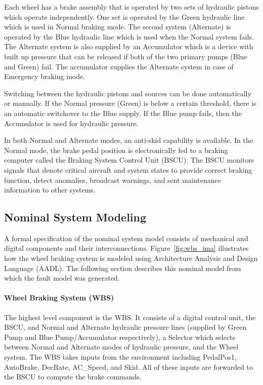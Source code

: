 Each wheel has a brake assembly that is operated by two sets of hydraulic pistons which operate independently. One set is operated by the Green hydraulic line which is used in Normal braking mode. The second system (Alternate) is operated by the Blue hydraulic line which is used when the Normal system fails. The Alternate system is also supplied by an Accumulator which is a device with built up pressure that can be released if both of the two primary pumps (Blue and Green) fail. The accumulator supplies the Alternate system in case of Emergency braking mode.

Switching between the hydraulic pistons and sources can be done automatically or manually. If the Normal pressure (Green) is below a certain threshold, there is an automatic switchover to the Blue supply. If the Blue pump fails, then the Accumulator is used for hydraulic pressure.

In both Normal and Alternate modes, an anti-skid capability is available. In the Normal mode, the brake pedal position is electronically fed to a braking computer called the Braking System Control Unit (BSCU). The BSCU monitors signals that denote critical aircraft and system states to provide correct braking function, detect anomalies, broadcast warnings, and sent maintenance information to other systems.

\subsection{Nominal System Modeling}
A formal specification of the nominal system model consists of mechanical and digital components and their interconnections. Figure~\ref{fig:wbs_ima} illustrates how the wheel braking system is modeled using Architecture Analysis and Design Language (AADL). The following section describes this nominal model from which the fault model was generated.

\paragraph{Wheel Braking System (WBS)}
The highest level component is the WBS. It consists of a digital control unit, the BSCU, and Normal and Alternate hydraulic pressure lines (supplied by Green Pump and Blue Pump/Accumulator respectively), a Selector which selects between Normal and Alternate modes of hydraulic pressure, and the Wheel system. The WBS takes inputs from the environment including PedalPos1, AutoBrake, DecRate, AC\_Speed, and Skid. All of these inputs are forwarded to the BSCU to compute the brake commands.

